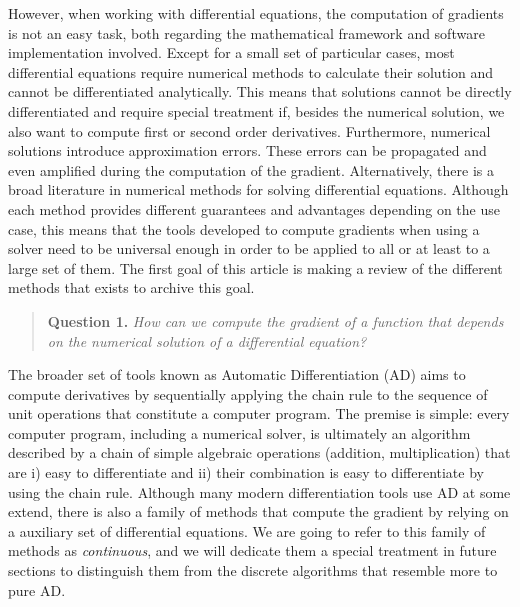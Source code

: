 However, when working with differential equations, the computation of gradients is not an easy task, both regarding the mathematical framework and software implementation involved. 
Except for a small set of particular cases, most differential equations require numerical methods to calculate their solution and cannot be differentiated analytically. 
This means that solutions cannot be directly differentiated and require special treatment if, besides the numerical solution, we also want to compute first or second order derivatives. 
Furthermore, numerical solutions introduce approximation errors. 
These errors can be propagated and even amplified during the computation of the gradient. 
Alternatively, there is a broad literature in numerical methods for solving differential equations. 
Although each method provides different guarantees and advantages depending on the use case, this means that the tools developed to compute gradients when using a solver need to be universal enough in order to be applied to all or 
at least to a large set of them. 
The first goal of this article is making a review of the different methods that exists to archive this goal.
\begin{quote}
    \textbf{Question 1. }
    \textit{How can we compute the gradient of a function that depends on the numerical solution of a differential equation?}
\end{quote}

The broader set of tools known as Automatic Differentiation (AD) aims to compute derivatives by sequentially applying the chain rule to the sequence of unit operations that constitute a computer program. 
The premise is simple: every computer program, including a numerical solver, is ultimately an algorithm described by a chain of simple algebraic operations (addition, multiplication) that are i) easy to differentiate and ii) their combination is easy to differentiate by using the chain rule. 
Although many modern differentiation tools use AD at some extend, there is also a family of methods that compute the gradient by relying on a auxiliary set of differential equations. 
We are going to refer to this family of methods as \textit{continuous}, and we will dedicate them a special treatment in future sections to distinguish them from the discrete algorithms that resemble more to pure AD. 

